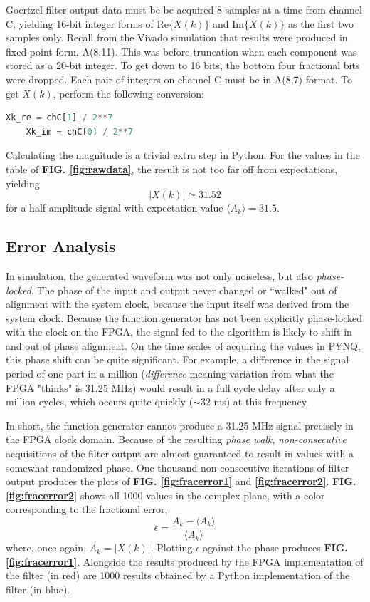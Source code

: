 \documentclass[reprint,amsmath,amssymb,aps,pra]{revtex4-2}
\begin{document}
Goertzel filter output data must be be acquired 8 samples at a time from channel C, yielding 16-bit integer forms of Re$\{X(k)\}$ and Im$\{X(k)\}$ as the first two samples only. Recall from the Vivado simulation that results were produced in fixed-point form, A(8,11). This was before truncation when each component was stored as a 20-bit integer. To get down to 16 bits, the bottom four fractional bits were dropped. Each pair of integers on channel C must be in A(8,7) format. To get $X(k)$, perform the following conversion:
\begin{lstlisting}[language=Python]
    Xk_re = chC[1] / 2**7
    Xk_im = chC[0] / 2**7
\end{lstlisting}
Calculating the magnitude is a trivial extra step in Python. For the values in the table of \textbf{FIG. \ref{fig:rawdata}}, the result is not too far off from expectations, yielding
\begin{equation}
    |X(k)| \simeq 31.52
\end{equation}
for a half-amplitude signal with expectation value $\langle A_k \rangle = 31.5$.

\subsection{Error Analysis}

In simulation, the generated waveform was not only noiseless, but also \textit{phase-locked}. The phase of the input and output never changed or ``walked" out of alignment with the system clock, because the input itself was derived from the system clock. Because the function generator has not been explicitly phase-locked with the clock on the FPGA, the signal fed to the algorithm is likely to shift in and out of phase alignment. On the time scales of acquiring the values in PYNQ, this phase shift can be quite significant. For example, a difference in the signal period of one part in a million (\textit{difference} meaning variation from what the FPGA "thinks" is 31.25 MHz) would result in a full cycle delay after only a million cycles, which occurs quite quickly ($\sim 32$ ms) at this frequency.

In short, the function generator cannot produce a 31.25 MHz signal precisely in the FPGA clock domain. Because of the resulting \textit{phase walk}, \textit{non-consecutive} acquisitions of the filter output are almost guaranteed to result in values with a somewhat randomized phase. One thousand non-consecutive iterations of filter output produces the plots of \textbf{FIG. \ref{fig:fracerror1}} and \textbf{\ref{fig:fracerror2}}. \textbf{FIG. \ref{fig:fracerror2}} shows all 1000 values in the complex plane, with a color corresponding to the fractional error,
\begin{equation}
    \epsilon = \frac{A_k - \langle A_k \rangle}{\langle A_k \rangle}
\end{equation}
where, once again, $A_k = |X(k)|$. Plotting $\epsilon$ against the phase produces \textbf{FIG. \ref{fig:fracerror1}}. Alongside the results produced by the FPGA implementation of the filter (in red) are 1000 results obtained by a Python implementation of the filter (in blue).
\end{document}
